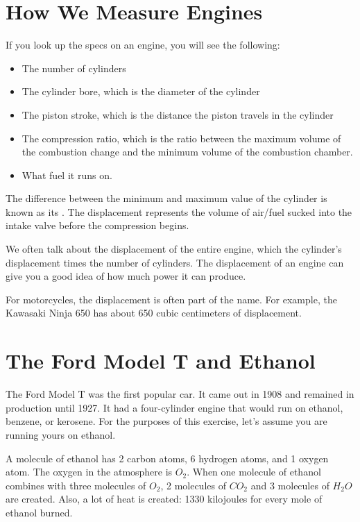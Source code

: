 \section{How We Measure Engines}

If you look up the specs on an engine,  you will see the following:

\begin{itemize}
\item The number of cylinders
\item The cylinder bore, which is the diameter of the cylinder
\item The piston stroke,  which is the distance the piston travels in the cylinder
\item The compression ratio,  which is the ratio between the maximum volume of the combustion change and the minimum volume of the combustion chamber.
\item What fuel it runs on.
\end{itemize}

The difference between the minimum and maximum value of the cylinder is known as its .   The displacement represents the volume of air/fuel sucked into the intake valve 
before the compression begins.

We often talk about the displacement of the entire engine, which the
 cylinder's displacement times the number of cylinders.  The displacement of an engine can give you a
 good idea of how much power it can produce.
 
For motorcycles,  the displacement is often part of the name.   For example,  the Kawasaki Ninja 650 has about 650 cubic centimeters of displacement.  

\section{The Ford Model T and Ethanol}

The Ford Model T was the first popular car.   It came out in 1908 and remained in production until 1927.  It had a four-cylinder engine that would run on ethanol, benzene, or kerosene.  For the purposes of this exercise, let's assume you are running yours on ethanol.

A molecule of ethanol has 2 carbon atoms, 6 hydrogen atoms, and 1 oxygen atom.  The oxygen in the atmosphere is $O_2$.   When one molecule of ethanol combines with three molecules of $O_2$,  2 molecules of $CO_2$ and 3 molecules of $H_2O$ are created.  Also, a lot of heat is created: 1330 kilojoules for every mole of ethanol burned.

